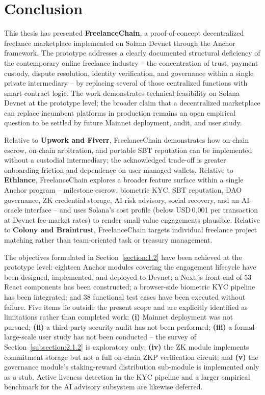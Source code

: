\section{Conclusion}
\label{section:6.1}

This thesis has presented \textbf{FreelanceChain}, a proof-of-concept decentralized freelance marketplace implemented on Solana Devnet through the Anchor framework. The prototype addresses a clearly documented structural deficiency of the contemporary online freelance industry -- the concentration of trust, payment custody, dispute resolution, identity verification, and governance within a single private intermediary -- by replacing several of those centralized functions with smart-contract logic. The work demonstrates technical feasibility on Solana Devnet at the prototype level; the broader claim that a decentralized marketplace can replace incumbent platforms in production remains an open empirical question to be settled by future Mainnet deployment, audit, and user study.

Relative to \textbf{Upwork and Fiverr}, FreelanceChain demonstrates how on-chain escrow, on-chain arbitration, and portable SBT reputation can be implemented without a custodial intermediary; the acknowledged trade-off is greater onboarding friction and dependence on user-managed wallets. Relative to \textbf{Ethlance}, FreelanceChain explores a broader feature surface within a single Anchor program -- milestone escrow, biometric KYC, SBT reputation, DAO governance, ZK credential storage, AI risk advisory, social recovery, and an AI-oracle interface -- and uses Solana's cost profile (below USD\,0.001 per transaction at Devnet fee-market rates) to render small-value engagements plausible. Relative to \textbf{Colony and Braintrust}, FreelanceChain targets individual freelance project matching rather than team-oriented task or treasury management.

The objectives formulated in Section~\ref{section:1.2} have been achieved at the prototype level: eighteen Anchor modules covering the engagement lifecycle have been designed, implemented, and deployed to Devnet; a Next.js front-end of 53 React components has been constructed; a browser-side biometric KYC pipeline has been integrated; and 38 functional test cases have been executed without failure. Five items lie outside the present scope and are explicitly identified as limitations rather than completed work: \textbf{(i)} Mainnet deployment was not pursued; \textbf{(ii)} a third-party security audit has not been performed; \textbf{(iii)} a formal large-scale user study has not been conducted -- the survey of Section~\ref{subsection:2.1.2} is exploratory only; \textbf{(iv)} the ZK module implements commitment storage but not a full on-chain ZKP verification circuit; and \textbf{(v)} the governance module's staking-reward distribution sub-module is implemented only as a stub. Active liveness detection in the KYC pipeline and a larger empirical benchmark for the AI advisory subsystem are likewise deferred.

